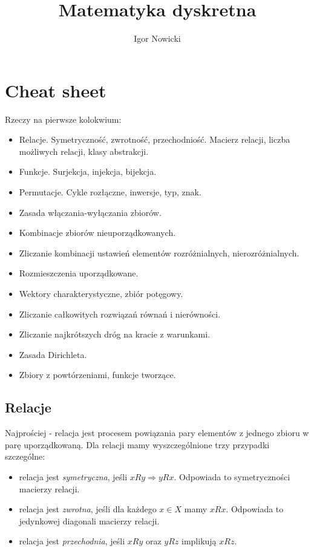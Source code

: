 \documentclass[11pt]{article}
\title{Matematyka dyskretna}
\author{Igor Nowicki}
\theoremstyle{definition}
\numberwithin{zadanie}{subsection}
\begin{document}
\maketitle
\tableofcontents

\section{Cheat sheet}

Rzeczy na pierwsze kolokwium:
\begin{itemize}
    \item Relacje. Symetryczność, zwrotność, przechodniość. Macierz relacji, liczba możliwych relacji, klasy abstrakcji.
    \item Funkcje. Surjekcja, injekcja, bijekcja.
    \item Permutacje. Cykle rozłączne, inwersje, typ, znak.
    \item Zasada włączania-wyłączania zbiorów.
    \item Kombinacje zbiorów nieuporządkowanych.
    \item Zliczanie kombinacji ustawień elementów rozróżnialnych, nierozróżnialnych.
    \item Rozmieszczenia uporządkowane.
    \item Wektory charakterystyczne, zbiór potęgowy.
    \item Zliczanie całkowitych rozwiązań równań i nierówności.
    \item Zliczanie najkrótszych dróg na kracie z warunkami.
    \item Zasada Dirichleta.
    \item Zbiory z powtórzeniami, funkcje tworzące.
\end{itemize}

\subsection{Relacje}

Najprościej - relacja jest procesem powiązania pary elementów z jednego zbioru w parę uporządkowaną. Dla relacji mamy wyszczególnione trzy przypadki szczególne:
\begin{itemize}
    \item relacja jest \textit{symetryczna}, jeśli $xRy \Rightarrow yRx$. Odpowiada to symetryczności macierzy relacji.
    \item relacja jest \textit{zwrotna}, jeśli dla każdego $x\in X$ mamy $xRx$. Odpowiada to jedynkowej diagonali macierzy relacji.
    \item relacja jest \textit{przechodnia}, jeśli $xRy$ oraz $yRz$ implikują $xRz$.
\end{itemize}
\end{document}

